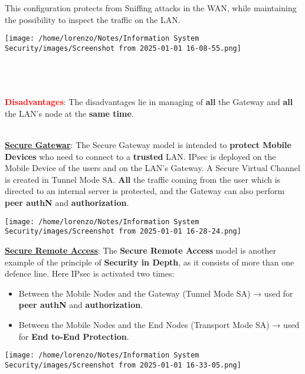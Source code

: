 \begin{itemize}
\begin{minipage}{0.6\textwidth}
\begin{itemize}
\end{itemize}
This configuration protects from Sniffing attacks in the WAN, while maintaining the possibility
to inspect the traffic on the LAN.
\end{minipage} 
\hspace{0.2cm}
\begin{minipage}{0.4\textwidth}
    \centering
    \texttt{[image: /home/lorenzo/Notes/Information System Security/images/Screenshot from 2025-01-01 16-08-55.png]}
\end{minipage}
\\    \\    \\
\textcolor{red}{\textbf{Disadvantages}}: The disadvantages lie in managing of \textbf{all} the Gateway and \textbf{all} the LAN's node at the \textbf{same time}.
\\   \\
\begin{minipage}{0.6\textwidth}
	\vspace{-0.5cm}
\item \underline{\textbf{Secure Gatewar}}: The Secure Gateway model is intended to \textbf{protect Mobile Devices} who need to connect to a \textbf{trusted} LAN. IPsec is deployed on the Mobile Device of the users and on the LAN’s Gateway. A Secure Virtual Channel is created in Tunnel Mode SA. \textbf{All} the traffic coming from the user which is directed to an internal server is protected, and the Gateway can also perform \textbf{peer authN} and \textbf{authorization}.
\end{minipage} 
\hspace{0.2cm}
\begin{minipage}{0.4\textwidth}
    \centering
    \texttt{[image: /home/lorenzo/Notes/Information System Security/images/Screenshot from 2025-01-01 16-28-24.png]}
\end{minipage}
\begin{minipage}{0.6\textwidth}
\item \underline{\textbf{Secure Remote Access}}: 
The \textbf{Secure Remote Access} model is another example of the principle of \textbf{Security in Depth}, as it consists of more than one defence line. Here IPsec is activated two times:
\begin{itemize}
    \item Between the Mobile Nodes and the Gateway (Tunnel Mode SA) → used for \textbf{peer authN} and \textbf{authorization}.
    \item Between the Mobile Nodes and the End Nodes (Transport Mode SA) → used for \textbf{End to-End Protection}.
\end{itemize}
\end{minipage} 
\hspace{0.3cm}
\begin{minipage}{0.4\textwidth}
    \centering
    \texttt{[image: /home/lorenzo/Notes/Information System Security/images/Screenshot from 2025-01-01 16-33-05.png]}
\end{minipage}
\end{itemize} 


